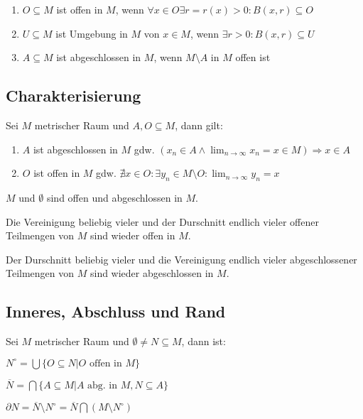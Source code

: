 \begin{enumerate}[label=(\alph*)]
	\item $O \subseteq M$ ist offen in $M$, wenn $\forall x \in O \exists r = r(x) > 0 : B(x, r) \subseteq O$
	\item $U \subseteq M$ ist Umgebung in $M$ von $x \in M$, wenn $\exists r > 0 : B(x, r) \subseteq U$
	\item $A \subseteq M$ ist abgeschlossen in $M$, wenn $M\setminus A$ in $M$ offen ist
\end{enumerate}

\subsection*{Charakterisierung}

Sei $M$ metrischer Raum und $A, O \subseteq M$, dann gilt:

\begin{enumerate}[label=(\alph*)]
	\item $A$ ist abgeschlossen in $M$ gdw. $(x_n \in A \land \lim_{n \to \infty} x_n = x \in M ) \Rightarrow x \in A$
	\item $O$ ist offen in $M$ gdw. $\nexists x \in O : \exists y_n \in M \setminus O : \lim_{n \to \infty} y_n = x$
\end{enumerate}

$M$ und $\emptyset$ sind offen und abgeschlossen in $M$.

Die Vereinigung beliebig vieler und der Durschnitt endlich vieler offener Teilmengen von $M$ sind wieder offen in $M$.

Der Durschnitt beliebig vieler und die Vereinigung endlich vieler abgeschlossener Teilmengen von $M$ sind wieder abgeschlossen in $M$.

\subsection*{Inneres, Abschluss und Rand}

Sei $M$ metrischer Raum und $\emptyset \neq N \subseteq M$, dann ist:

\begin{description}[leftmargin=!,labelwidth=15mm]
	\item[Innere] $N^\circ = \bigcup \{ O \subseteq N | O \text{ offen in } M \}$
	\item[Abschluss] $\overline N = \bigcap\{A \subseteq M | A \text{ abg. in } M, N \subseteq A\}$
	\item[Rand] $\partial N = \overline N \setminus N^\circ = \overline N \bigcap (M \setminus N^\circ)$
\end{description}


